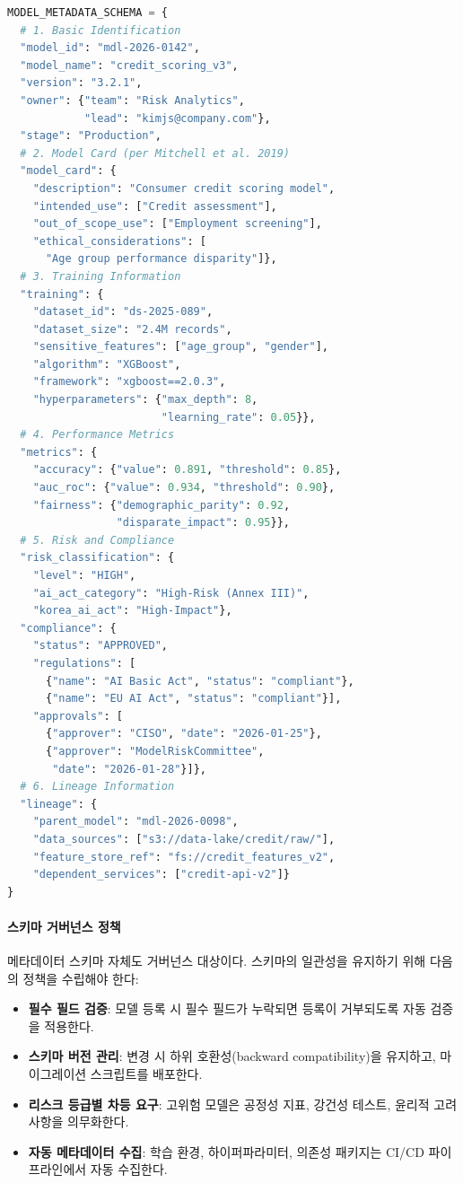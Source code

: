 \begin{lstlisting}[language=Python, caption={Comprehensive Model Metadata Schema (JSON)}, label={lst:metadata_schema}]
MODEL_METADATA_SCHEMA = {
  # 1. Basic Identification
  "model_id": "mdl-2026-0142",
  "model_name": "credit_scoring_v3",
  "version": "3.2.1",
  "owner": {"team": "Risk Analytics",
            "lead": "kimjs@company.com"},
  "stage": "Production",
  # 2. Model Card (per Mitchell et al. 2019)
  "model_card": {
    "description": "Consumer credit scoring model",
    "intended_use": ["Credit assessment"],
    "out_of_scope_use": ["Employment screening"],
    "ethical_considerations": [
      "Age group performance disparity"]},
  # 3. Training Information
  "training": {
    "dataset_id": "ds-2025-089",
    "dataset_size": "2.4M records",
    "sensitive_features": ["age_group", "gender"],
    "algorithm": "XGBoost",
    "framework": "xgboost==2.0.3",
    "hyperparameters": {"max_depth": 8,
                        "learning_rate": 0.05}},
  # 4. Performance Metrics
  "metrics": {
    "accuracy": {"value": 0.891, "threshold": 0.85},
    "auc_roc": {"value": 0.934, "threshold": 0.90},
    "fairness": {"demographic_parity": 0.92,
                 "disparate_impact": 0.95}},
  # 5. Risk and Compliance
  "risk_classification": {
    "level": "HIGH",
    "ai_act_category": "High-Risk (Annex III)",
    "korea_ai_act": "High-Impact"},
  "compliance": {
    "status": "APPROVED",
    "regulations": [
      {"name": "AI Basic Act", "status": "compliant"},
      {"name": "EU AI Act", "status": "compliant"}],
    "approvals": [
      {"approver": "CISO", "date": "2026-01-25"},
      {"approver": "ModelRiskCommittee",
       "date": "2026-01-28"}]},
  # 6. Lineage Information
  "lineage": {
    "parent_model": "mdl-2026-0098",
    "data_sources": ["s3://data-lake/credit/raw/"],
    "feature_store_ref": "fs://credit_features_v2",
    "dependent_services": ["credit-api-v2"]}
}
\end{lstlisting}

\paragraph{스키마 거버넌스 정책}

메타데이터 스키마 자체도 거버넌스 대상이다. 스키마의 일관성을 유지하기 위해 다음의 정책을 수립해야 한다:

\begin{itemize}
  \item \textbf{필수 필드 검증}: 모델 등록 시 필수 필드가 누락되면 등록이 거부되도록 자동 검증을 적용한다.
  \item \textbf{스키마 버전 관리}: 변경 시 하위 호환성(backward compatibility)을 유지하고, 마이그레이션 스크립트를 배포한다.
  \item \textbf{리스크 등급별 차등 요구}: 고위험 모델은 공정성 지표, 강건성 테스트, 윤리적 고려사항을 의무화한다.
  \item \textbf{자동 메타데이터 수집}: 학습 환경, 하이퍼파라미터, 의존성 패키지는 CI/CD 파이프라인에서 자동 수집한다\cite{kreuzberger2023machine}.
\end{itemize}

